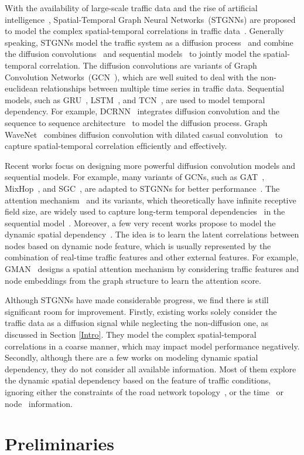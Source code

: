 \documentclass[sigconf, nonacm]{acmart}
\begin{document}
{\color{black}With the availability of large-scale traffic data and the rise of artificial intelligence~\cite{Innovation}, Spatial-Temporal Graph Neural Networks~(STGNNs) are proposed to model the complex spatial-temporal correlations in traffic data~\cite{2017DCRNN, 2018GaAN, 2018STGCN, 2019STMetaNet, shao2022pre}.
Generally speaking, STGNNs model the traffic system as a diffusion process~\cite{2017DCRNN} and combine the diffusion convolutions~\cite{2017DCRNN, GWNet} and sequential models~\cite{2014GRU, 2016TCN} to jointly model the spatial-temporal correlation.
The diffusion convolutions are variants of Graph Convolution Networks~(GCN~\cite{2013FirstGCN, 2016ChebNet, 2017GCN}), which are well suited to deal with the non-euclidean relationships between multiple time series in traffic data.
Sequential models, such as GRU~\cite{2014GRU}, LSTM~\cite{FC-LSTM}, and TCN~\cite{2016TCN}, are used to model temporal dependency.
For example, DCRNN~\cite{2017DCRNN} integrates diffusion convolution and the sequence to sequence architecture~\cite{2014Seq2Seq} to model the diffusion process.
Graph WaveNet~\cite{GWNet} combines diffusion convolution with dilated casual convolution~\cite{2016TCN} to capture spatial-temporal correlation efﬁciently and effectively.

Recent works focus on designing more powerful diffusion convolution models and sequential models. 
For example, many variants of GCNs, such as GAT~\cite{2018GAT}, MixHop~\cite{2019MixHop}, and SGC~\cite{2019SGC}, are adapted to STGNNs for better performance~\cite{2020MTGNN, 2020CGC, 2019STGRAT, 2020STSGCN, 2020TSSRGCN, 2020SLCNN}.
The attention mechanism~\cite{2017Transformer} and its variants, which theoretically have infinite receptive field size, are widely used to capture long-term temporal dependencies~\cite{2021ASTGNN} in the sequential model~\cite{2020STGNN, Informer}.
Moreover, a few very recent works propose to model the dynamic spatial dependency~\cite{2020GMAN, 2021DMSTGCN}.
The idea is to learn the latent correlations between nodes based on dynamic node feature, which is usually represented by the combination of real-time traffic features and other external features.
For example, 
GMAN~\cite{2020GMAN} designs a spatial attention mechanism by considering traffic features and node embeddings from the graph structure to learn the attention score.

Although STGNNs have made considerable progress, we find there is still significant room for improvement.
Firstly, existing works solely consider the traffic data as a diffusion signal while neglecting the non-diffusion one, as discussed in Section \ref{Intro}.
They model the complex spatial-temporal correlations in a coarse manner, which may impact model performance negatively.
Secondly, although there are a few works on modeling dynamic spatial dependency, they do not consider all available information.
Most of them explore the dynamic spatial dependency based on the feature of traffic conditions, ignoring either the constraints of the road network topology~\cite{2021DMSTGCN}, or the time~\cite{2020GMAN} or node~\cite{2019ASTGCN} information.
} \section{Preliminaries}
\end{document}
